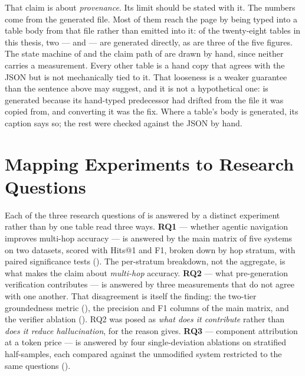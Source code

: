That claim is about \emph{provenance}. Its limit should be stated with it.
The numbers come from the generated file. Most of them reach the page by
being typed into a table body from that file rather than emitted into it: of the
twenty-eight tables in this thesis, two ---  and
 --- are generated directly, as are three of the five
figures. The state machine of  and the claim path of
 are drawn by hand, since neither carries a measurement.
Every other table is a hand copy that agrees with the JSON but is not
mechanically tied to it. That looseness is a weaker guarantee than the sentence
above may suggest, and it is not a hypothetical one:  is
generated because its hand-typed predecessor had drifted from the file it was
copied from, and converting it was the fix. Where a table's body is generated,
its caption says so; the rest were checked against the JSON by hand.

\section{Mapping Experiments to Research Questions}\label{sec:experiment-map}

Each of the three research questions of  is answered by a distinct
experiment rather than by one table read three ways. \textbf{RQ1} --- whether
agentic navigation improves multi-hop accuracy --- is answered by the main
matrix of five systems on two datasets, scored with Hits@1 and F1, broken down
by hop stratum, with paired significance tests
(). The per-stratum
breakdown, not the aggregate, is what makes the claim about \emph{multi-hop}
accuracy. \textbf{RQ2} --- what pre-generation verification contributes --- is
answered by three measurements that do not agree with one another. That
disagreement is itself the finding: the two-tier groundedness metric
(), the precision and F1 columns of the main
matrix, and the verifier ablation (). RQ2 was posed as
\emph{what does it contribute} rather than \emph{does it reduce hallucination},
for the reason  gives. \textbf{RQ3} --- component attribution
at a token price --- is answered by four single-deviation ablations on
stratified half-samples, each compared against the unmodified system restricted
to the same questions ().

